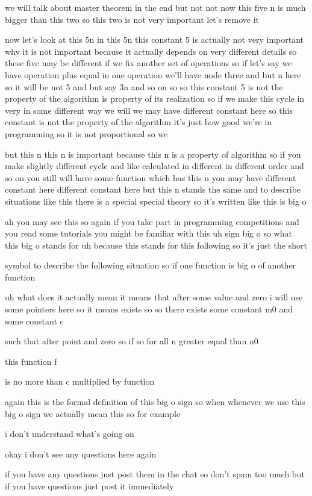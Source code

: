 we will talk about master theorem in the end but not not now this five n is much bigger than this two so this two is not very important let's remove it

now let's look at this 5n in this 5n this constant 5 is actually not very important why it is not important because it actually depends on very different details so these five may be different if we fix another set of operations so if let's say we have operation plus equal in one operation we'll have node three and but n here so it will be not 5 and but say 3n and so on so so this constant 5 is not the property of the algorithm is property of its realization so if we make this cycle in very in some different way we will we may have different constant here so this constant is not the property of the algorithm it's just how good we're in programming so it is not proportional so we

but this n this n is important because this n is a property of algorithm so if you make slightly different cycle and like calculated in different in different order and so on you still will have some function which has this n you may have different constant here different constant here but this n stands the same and to describe situations like this there is a special special theory so it's written like this is big o

ah you may see this so again if you take part in programming competitions and you read some tutorials you might be familiar with this uh sign big o so what this big o stands for uh because this stands for this following so it's just the short

symbol to describe the following situation so if one function is big o of another function

uh what does it actually mean it means that after some value and zero i will use some pointers here so it means exists so so there exists some constant m0 and some constant c

such that after point and zero so if so for all n greater equal than n0

this function f

is no more than c multiplied by function

again this is the formal definition of this big o sign so when whenever we use this big o sign we actually mean this so for example

i don't understand what's going on

okay i don't see any questions here again

if you have any questions just post them in the chat so don't spam too much but if you have questions just post it immediately


